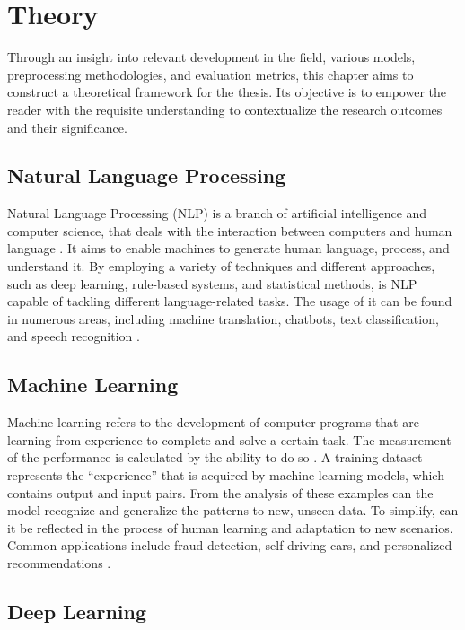 \chapter{Theory}

Through an insight into relevant development in the field, various models, preprocessing methodologies, and evaluation metrics, this chapter aims to construct a theoretical framework for the thesis. Its objective is to empower the reader with the requisite understanding to contextualize the research outcomes and their significance.

\section{Natural Language Processing}

Natural Language Processing (NLP) is a branch of artificial intelligence and computer science, that deals with the interaction between computers and human language \citep{helland_tackling_2023}. It aims to enable machines to generate human language, process, and understand it. By employing a variety of techniques and different approaches, such as deep learning, rule-based systems, and statistical methods, is NLP capable of tackling different language-related tasks. The usage of it can be found in numerous areas, including machine translation, chatbots, text classification, and speech recognition \citep{helland_tackling_2023}.

\section{Machine Learning}

Machine learning refers to the development of computer programs that are learning from experience to complete and solve a certain task. The measurement of the performance is calculated by the ability to do so \citep{helland_tackling_2023}. A training dataset represents the “experience” that is acquired by machine learning models, which contains output and input pairs. From the analysis of these examples can the model recognize and generalize the patterns to new, unseen data. To simplify, can it be reflected in the process of human learning and adaptation to new scenarios. Common applications include fraud detection, self-driving cars, and personalized recommendations \citep{helland_tackling_2023}.

\section{Deep Learning}

